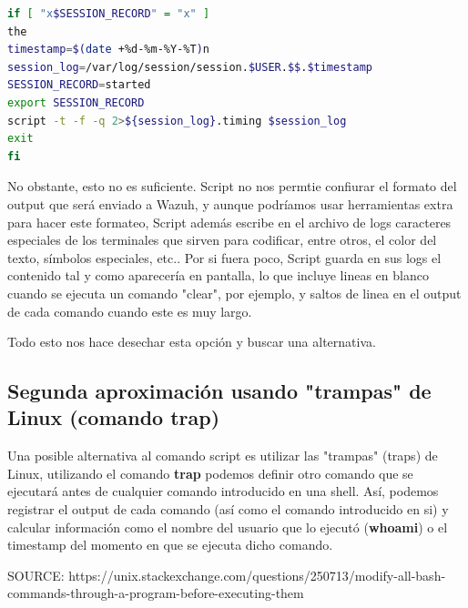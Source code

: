 \begin{lstlisting}[language=bash,caption={Session recorder (/etc/profile)}]
if [ "x$SESSION_RECORD" = "x" ]
the
timestamp=$(date +%d-%m-%Y-%T)n
session_log=/var/log/session/session.$USER.$$.$timestamp
SESSION_RECORD=started
export SESSION_RECORD
script -t -f -q 2>${session_log}.timing $session_log
exit
fi

\end{lstlisting}

No obstante, esto no es suficiente. Script no nos permtie confiurar el formato del output que será enviado a Wazuh, y aunque podríamos usar herramientas extra para hacer este formateo, Script además escribe en el archivo de logs caracteres especiales de los terminales que sirven para codificar, entre otros, el color del texto, símbolos especiales, etc.. Por si fuera poco, Script guarda en sus logs el contenido tal y como aparecería en pantalla, lo que incluye lineas en blanco cuando se ejecuta un comando "clear", por ejemplo, y saltos de linea en el output de cada comando cuando este es muy largo.

Todo esto nos hace desechar esta opción y buscar una alternativa.

\subsection{Segunda aproximación usando "trampas" de Linux (comando trap)}

Una posible alternativa al comando script es utilizar las "trampas" (traps) de Linux, utilizando el comando \textbf{trap} podemos definir otro comando que se ejecutará antes de cualquier comando introducido en una shell. Así, podemos registrar el output de cada comando (así como el comando introducido en si) y calcular información como el nombre del usuario que lo ejecutó (\textbf{whoami}) o el timestamp del momento en que se ejecuta dicho comando. 

SOURCE: https://unix.stackexchange.com/questions/250713/modify-all-bash-commands-through-a-program-before-executing-them

